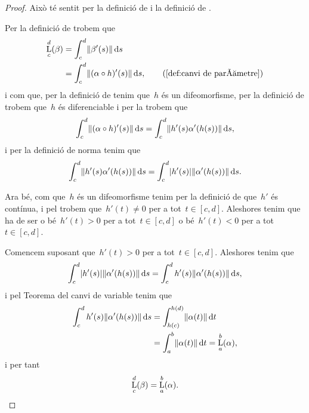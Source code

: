 \documentclass[../../main.tex]{subfiles}
\begin{document}
    \begin{proof}
        Això té sentit per la definició de  i la definició de .

        Per la definició de  trobem que
        \begin{align*}
            \Long_{c}^{d}(\beta)&=\int_{c}^{d}\norm{\beta'(s)}\diff s \\
            &=\int_{c}^{d}\norm{(\alpha\circ h)'(s)}\diff s, \tag{\ref{def:canvi de paràmetre}}
        \end{align*}
        i com que, per la definició de  tenim que~\(h\) és un difeomorfisme, per la definició de  trobem que~\(h\) és diferenciable i per la  trobem que
        \[
            \int_{c}^{d}\norm{(\alpha\circ h)'(s)}\diff s=\int_{c}^{d}\norm{h'(s)\alpha'(h(s))}\diff s,
        \]
        i per la definició de norma tenim que%
        \[
            \int_{c}^{d}\norm{h'(s)\alpha'(h(s))}\diff s=\int_{c}^{d}\abs{h'(s)}\norm{\alpha'(h(s))}\diff s.
        \]

        Ara bé, com que~\(h\) és un difeomorfisme tenim per la definició de  que~\(h'\) és contínua, i pel \corollari{}  trobem que~\(h'(t)\neq0\) per a tot~\(t\in[c,d]\).
        Aleshores tenim que ha de ser o bé~\(h'(t)>0\) per a tot~\(t\in[c,d]\) o bé~\(h'(t)<0\) per a tot~\(t\in[c,d]\).

        Comencem suposant que~\(h'(t)>0\) per a tot~\(t\in[c,d]\).
        Aleshores tenim que
        \[
            \int_{c}^{d}\abs{h'(s)}\norm{\alpha'(h(s))}\diff s=\int_{c}^{d}h'(s)\norm{\alpha'(h(s))}\diff s,
        \]
        i pel Teorema del canvi de variable tenim que %
        \begin{align*}
            \int_{c}^{d}h'(s)\norm{\alpha'(h(s))}\diff s&=\int_{h(c)}^{h(d)}\norm{\alpha(t)}\diff t \\
            &=\int_{a}^{b}\norm{\alpha(t)}\diff t=\Long_{a}^{b}(\alpha),
        \end{align*}
        i per tant
        \[
            \operatorname*{L}_{c}^{d}(\beta)=\operatorname*{L}_{a}^{b}(\alpha).
        \]


\end{proof}
\end{document}
